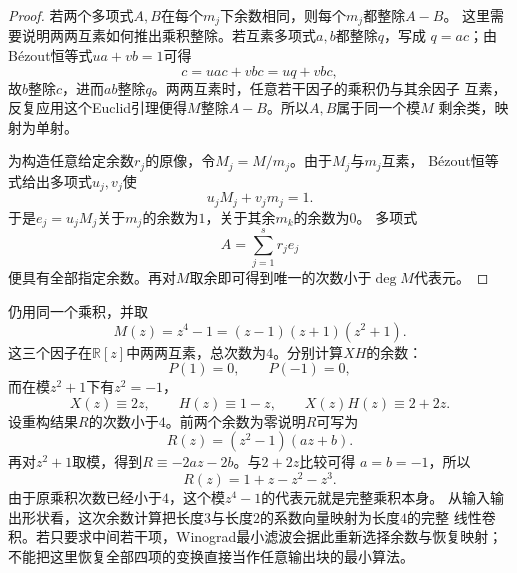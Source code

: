 \begin{proof}
若两个多项式$A,B$在每个$m_j$下余数相同，则每个$m_j$都整除$A-B$。
这里需要说明两两互素如何推出乘积整除。若互素多项式$a,b$都整除$q$，写成
$q=ac$；由Bézout恒等式$ua+vb=1$可得
\[
  c=uac+vbc=uq+vbc,
\]
故$b$整除$c$，进而$ab$整除$q$。两两互素时，任意若干因子的乘积仍与其余因子
互素，反复应用这个Euclid引理便得$M$整除$A-B$。所以$A,B$属于同一个模$M$
剩余类，映射为单射。

为构造任意给定余数$r_j$的原像，令$M_j=M/m_j$。由于$M_j$与$m_j$互素，
Bézout恒等式给出多项式$u_j,v_j$使
\[
  u_jM_j+v_jm_j=1.
\]
于是$e_j=u_jM_j$关于$m_j$的余数为$1$，关于其余$m_k$的余数为$0$。
多项式
\[
  A=\sum_{j=1}^{s}r_je_j
\]
便具有全部指定余数。再对$M$取余即可得到唯一的次数小于$\deg M$代表元。
\end{proof}

仍用同一个乘积，并取
\[
  M(z)=z^4-1=(z-1)(z+1)(z^2+1).
\]
这三个因子在$\mathbb{R}[z]$中两两互素，总次数为$4$。分别计算$XH$的余数：
\[
  P(1)=0,\qquad P(-1)=0,
\]
而在模$z^2+1$下有$z^2=-1$，
\[
  X(z)\equiv2z,\qquad
  H(z)\equiv1-z,\qquad
  X(z)H(z)\equiv2+2z.
\]
设重构结果$R$的次数小于$4$。前两个余数为零说明$R$可写为
\[
  R(z)=(z^2-1)(az+b).
\]
再对$z^2+1$取模，得到$R\equiv-2az-2b$。与$2+2z$比较可得
$a=b=-1$，所以
\[
  R(z)=1+z-z^2-z^3.
\]
由于原乘积次数已经小于$4$，这个模$z^4-1$的代表元就是完整乘积本身。
从输入输出形状看，这次余数计算把长度$3$与长度$2$的系数向量映射为长度$4$的完整
线性卷积。若只要求中间若干项，Winograd最小滤波会据此重新选择余数与恢复映射；
不能把这里恢复全部四项的变换直接当作任意输出块的最小算法。

